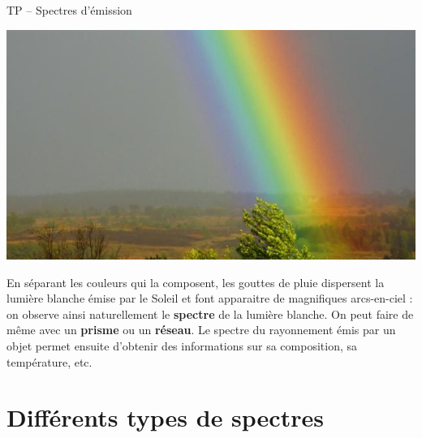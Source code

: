 \documentclass[12pt,a4paper,fleqn]{article}
\begin{document}
\begin{header}
TP -- Spectres d'émission
\end{header}

\begin{multicols}{2}
\begin{center}
\includegraphics[width=\linewidth]{images/arc_en_ciel.jpg}
\end{center}

En séparant les couleurs qui la composent, les gouttes de pluie dispersent la lumière blanche émise par le Soleil et font apparaitre de magnifiques arcs-en-ciel : on observe ainsi naturellement le \textbf{spectre} de la lumière blanche.
On peut faire de même avec un \textbf{prisme} ou un \textbf{réseau}.
Le spectre du rayonnement émis par un objet permet ensuite d'obtenir des informations sur sa composition, sa température, etc.
\end{multicols}

\section*{Différents types de spectres}
\end{document}
